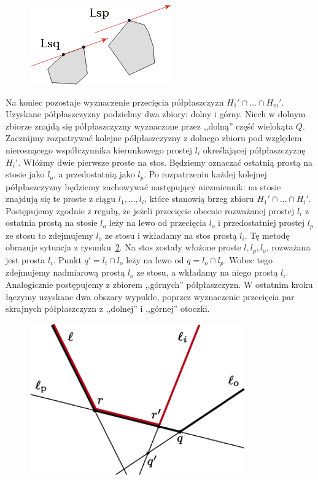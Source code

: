 \begin{figure}[htb]
  \centering
  \includegraphics[scale=1]{img/containment3}
  \caption{\label{img:containment3}}
\end{figure}

Na koniec pozostaje wyznaczenie przecięcia półpłaszczyzn $H_1' \cap
\ldots \cap H_m'$. Uzyskane półpłaszczyzny podzielmy dwa zbiory: dolny
i górny. Niech w dolnym zbiorze znajdą się półpłaszczyzny wyznaczone
przez ,,dolną'' część wielokąta $Q$. Zacznijmy rozpatrywać kolejne
półpłaszczyzny z dolnego zbioru pod względem nierosnącego
współczynnika kierunkowego prostej $l_i$ określającej półpłaszczyznę
$H_i'$. Włóżmy dwie pierwsze proste na stos. Będziemy oznaczać
ostatnią prostą na stosie jako $l_o$, a przedostatnią jako $l_p$. Po
rozpatrzeniu każdej kolejnej półpłaszczyzny będziemy zachowywać
następujący niezmiennik: na stosie znajdują się te proste z ciągu
$l_1, \ldots, l_i$, które stanowią brzeg zbioru $H_1' \cap \ldots \cap
H_i'$. Postępujemy zgodnie z regułą, że jeżeli przecięcie obecnie
rozważanej prostej $l_i$ z ostatnia prostą na stosie $l_o$ leży na
lewo od przecięcia $l_o$ i przedostatniej prostej  $l_p$ ze stosu to
zdejmujemy $l_o$ ze stosu i wkładamy na stos prostą $l_i$. Tę metodę
obrazuje sytuacja z rysunku~\ref{img:containment2}. Na stos zostały
włożone proste $l, l_p, l_o$, rozważana jest prosta $l_i$. Punkt $q' =
l_i \cap l_o$ leży na lewo od $q = l_o \cap l_p$. Wobec tego
zdejmujemy nadmiarową prostą $l_o$ ze stosu, a wkładamy na niego
prostą $l_i$. Analogicznie postępujemy z zbiorem ,,górnych''
półpłaszczyzn. W ostatnim kroku łączymy uzyskane dwa obszary wypukłe,
poprzez wyznaczenie przecięcia par skrajnych półpłaszczyzn z
,,dolnej'' i ,,górnej'' otoczki.

\begin{figure}[htb]
  \centering
  \includegraphics[scale=0.6]{img/containment2}
  \caption{\label{img:containment2}}
\end{figure}

